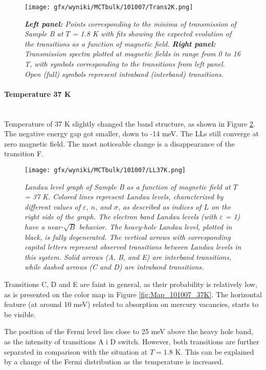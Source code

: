 \documentclass[titlepage,a4paper]{book}
\newcommand{\wciecie}{\quad\phantom{v}}
\newcommand{\myparagraph}[1]{\paragraph{#1}\mbox{}\\}
\begin{document}
\begin{figure}[H]
	\centering
	\texttt{[image: gfx/wyniki/MCTbulk/101007/Trans2K.png]}
	\vspace{-10pt}
	\caption{\textit{\textbf{Left panel:} Points corresponding to the minima of transmission of Sample B at $T$ = 1.8 K with fits showing the expected evolution of the transitions as a function of magnetic field. \textbf{Right panel:} Transmission spectra plotted at magnetic fields in range from 0 to 16 T, with symbols corresponding to the transitions from left panel. Open (full) symbols represent intraband (interband) transitions.}}
	\label{fig:Spectra_101007_2K}
\end{figure} 

\myparagraph{Temperature 37 K}
\wciecie
Temperature of 37 K slightly changed the band structure, as shown in Figure \ref{fig:LL_101007_37K}. The negative energy gap got smaller, down to -14 meV. The LLs still converge at zero magnetic field. The most noticeable change is a disappearance of the transition F. 

\begin{figure}[ht]
	\centering
	\texttt{[image: gfx/wyniki/MCTbulk/101007/LL37K.png]}
	\vspace{-10pt}
	\caption{\textit{Landau level graph of Sample B as a function of magnetic field at $T$ = 37 K. Colored lines represent Landau levels, characterized by different values of $\varepsilon$, $n$, and $\sigma$, as described as indices of $L$ on the right side of the graph. The electron band Landau levels (with $\varepsilon$ = 1) have a near-$\sqrt{B}$ behavior. The heavy-hole Landau level, plotted in black, is fully degenerated. The vertical arrows with corresponding capital letters represent observed transitions between Landau levels in this system. Solid arrows (A, B, and E) are interband transitions, while dashed arrows (C and D) are intraband transitions. }}
	\label{fig:LL_101007_37K}
\end{figure}
Transitions C, D and E are faint in general, as their probability is relatively low, as is presented on the color map in Figure \ref{fig:Map_101007_37K}. The horizontal feature (at around 10 meV) related to absorption on mercury vacancies, starts to be visible.

The position of the Fermi level lies close to 25 meV above the heavy hole band, as the intensity of transitions A i D switch. However, both transitions are further separated in comparison with the situation at $T = 1.8$ K. This can be explained by a change of the Fermi distribution as the temperature is increased.
\end{document}
